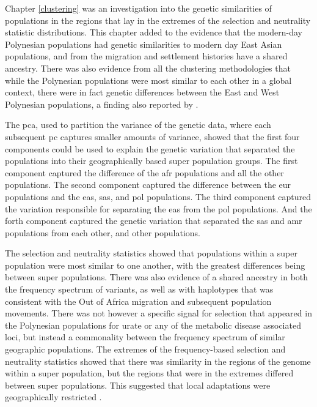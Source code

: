 \documentclass[twoside,openright]{report}
\begin{document}
Chapter \ref{clustering} was an investigation into the genetic
similarities of populations in the regions that lay in the extremes of
the selection and neutrality statistic distributions. This chapter added
to the evidence that the modern-day Polynesian populations had genetic
similarities to modern day East Asian populations, and from the
migration and settlement histories have a shared ancestry. There was
also evidence from all the clustering methodologies that while the
Polynesian populations were most similar to each other in a global
context, there were in fact genetic differences between the East and
West Polynesian populations, a finding also reported by
\citet{Hudjashov2018}.

The \glsdesc{pca}, used to partition the variance of the genetic data,
where each subsequent \glsdesc{pc} captures smaller amounts of variance,
showed that the first four components could be used to explain the
genetic variation that separated the populations into their
geographically based super population groups. The first component
captured the difference of the \gls{afr} populations and all the other
populations. The second component captured the difference between the
\gls{eur} populations and the \gls{eas}, \gls{sas}, and \gls{pol}
populations. The third component captured the variation responsible for
separating the \gls{eas} from the \gls{pol} populations. And the forth
component captured the genetic variation that separated the \gls{sas}
and \gls{amr} populations from each other, and other populations.

The selection and neutrality statistics showed that populations within a
super population were most similar to one another, with the greatest
differences being between super populations. There was also evidence of
a shared ancestry in both the frequency spectrum of variants, as well as
with haplotypes that was consistent with the Out of Africa migration and
subsequent population movements. There was not however a specific signal
for selection that appeared in the Polynesian populations for urate or
any of the metabolic disease associated loci, but instead a commonality
between the frequency spectrum of similar geographic populations. The
extremes of the frequency-based selection and neutrality statistics
showed that there was similarity in the regions of the genome within a
super population, but the regions that were in the extremes differed
between super populations. This suggested that local adaptations were
geographically restricted \citep{Gravel2011}.
\end{document}
